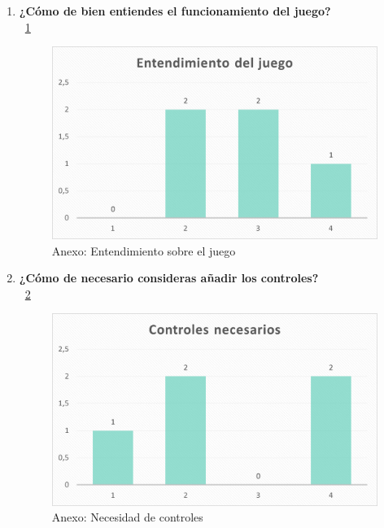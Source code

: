 \documentclass[12pt, a4paper,twoside,titlepage]{book}
\begin{document}
\begin{enumerate}[label=\textbf{\arabic*}.]
     \item \textbf{¿Cómo de bien entiendes el funcionamiento del juego?}\\
	~\ref{fig:anexEnten}
	 \begin{figure}
	 	\centering
	 	\includegraphics[width=.8\linewidth]{Anexo Demo/1AnexDem_enten}
	 	\caption{Anexo: Entendimiento sobre el juego}
	 	\label{fig:anexEnten}
	 \end{figure}
	 \item \textbf{¿Cómo de necesario consideras añadir los controles?}\\
	~\ref{fig:anexControl}
	 	 \begin{figure}
	 	\centering
	 	\includegraphics[width=.8\linewidth]{Anexo Demo/2AnexDem_controles}
	 	\caption{Anexo: Necesidad de controles}
	 	\label{fig:anexControl}
	 \end{figure}
	 

\end{enumerate}
\end{document}
